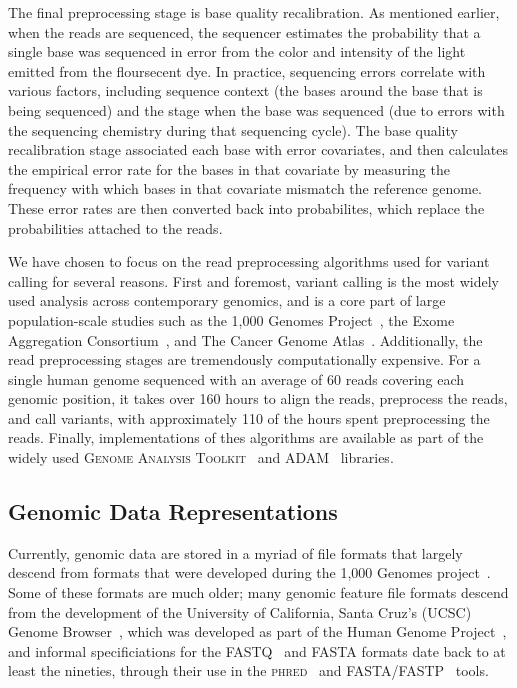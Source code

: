 \documentclass[phd]{ucbthesis}
\begin{document}
The final preprocessing stage is base quality recalibration. As mentioned
earlier, when the reads are sequenced, the sequencer estimates the probability
that a single base was sequenced in error from the color and intensity of the
light emitted from the floursecent dye. In practice, sequencing errors correlate
with various factors, including sequence context (the bases around the base that
is being sequenced) and the stage when the base was sequenced (due to errors
with the sequencing chemistry during that sequencing cycle). The base quality
recalibration stage associated each base with error covariates, and then
calculates the empirical error rate for the bases in that covariate by measuring
the frequency with which bases in that covariate mismatch the reference genome.
These error rates are then converted back into probabilites, which replace the
probabilities attached to the reads.

We have chosen to focus on the read preprocessing algorithms used for variant
calling for several reasons. First and foremost, variant calling is the most
widely used analysis across contemporary genomics, and is a core part of large
population-scale studies such as the 1,000 Genomes Project~\cite{1kg12, 1kg},
the Exome Aggregation Consortium~\cite{lek16}, and The Cancer Genome
Atlas~\cite{weinstein13}. Additionally, the read preprocessing stages are
tremendously computationally expensive. For a single human genome sequenced with
an average of 60 reads covering each genomic position, it takes over 160 hours
to align the reads, preprocess the reads, and call variants, with approximately
110 of the hours spent preprocessing the reads. Finally, implementations of thes
algorithms are available as part of the widely used \textsc{Genome Analysis
Toolkit}~\cite{mckenna10, depristo11} and \textsc{ADAM}~\cite{massie13,
nothaft15} libraries.

\subsection{Genomic Data Representations}
\label{sec:genomic-data-representations}

Currently, genomic data are stored in a myriad of file formats that largely
descend from formats that were developed during the 1,000 Genomes
project~\cite{1kg}. Some of these formats are much older; many genomic feature
file formats descend from the development of the University of California,
Santa Cruz's (UCSC) Genome Browser~\cite{kent02}, which was developed as part
of the Human Genome Project~\cite{lander01}, and informal specificiations for
the FASTQ~\cite{cock09} and FASTA formats date back to at least the nineties,
through their use in the \textsc{phred}~\cite{ewing98} and
\textsc{FASTA}/\textsc{FASTP}~\cite{pearson90} tools.
\end{document}
